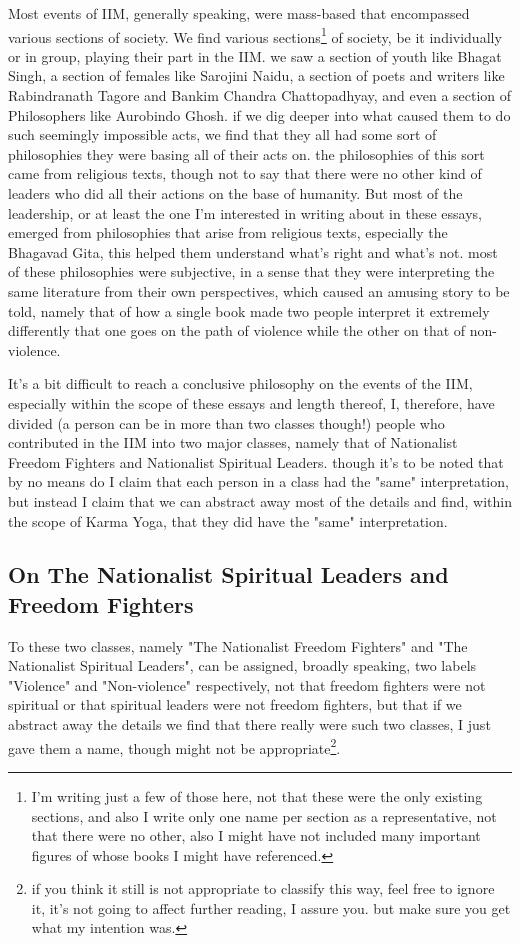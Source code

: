 \documentclass[a4paper]{article}
\begin{document}
Most events of IIM, generally speaking, were mass-based that encompassed various sections of society. 
We find various sections\footnote{I'm writing just a few of those here, not that these were the only existing sections, and also I write only 
one name per section as a representative, not that there were no other, also I might have not included many important figures of 
whose books I might have referenced.} of society, be it individually or in group, playing their part in the IIM. we saw a section of 
youth like Bhagat Singh, a section of females like Sarojini Naidu, a section of poets and writers like Rabindranath Tagore and Bankim Chandra Chattopadhyay,
and even a section of Philosophers like Aurobindo Ghosh. if we dig deeper into what caused them to do such
seemingly impossible acts, we find that they all had some sort of philosophies they were basing all of their acts on. the philosophies 
of this sort came from religious texts, though not to say that there were no other kind of leaders who did all their actions
on the base of humanity. But most of the leadership, or at least the one I'm interested in writing about in these essays,
emerged from philosophies that arise from religious texts, especially the Bhagavad Gita, this helped them understand what's right and what's not. most of these philosophies were subjective, in a sense that
they were interpreting the same literature from their own perspectives, which caused an amusing story to be told, namely that of how
a single book made two people interpret it extremely differently that one goes on the path of violence while the other on that of non-violence.

It's a bit difficult to reach a conclusive philosophy on the events of the IIM, especially within the scope of these essays and 
length thereof, I, therefore, have divided (a person can be in more than two classes though!) people who contributed in the IIM 
into two major classes, namely that of Nationalist Freedom Fighters and Nationalist Spiritual Leaders. though it's to be noted 
that by no means do I claim that each person in a class had the "same" interpretation, but instead I claim that we can abstract 
away most of the details and find, within the scope of Karma Yoga, that they did have the "same" interpretation. 

\subsection{On The Nationalist Spiritual Leaders and Freedom Fighters}
To these two classes, namely "The Nationalist Freedom Fighters" and "The Nationalist Spiritual Leaders", can be assigned, broadly speaking, 
two labels "Violence" and "Non-violence" respectively, not that freedom fighters were not spiritual or that spiritual leaders were not
freedom fighters, but that if we abstract away the details we find that there really were such two classes, I just gave them a name, though
might not be appropriate\footnote{if you think it still is not appropriate to classify this way, feel free to ignore it, it's not
going to affect further reading, I assure you. but make sure you get what my intention was.}.
\end{document}
